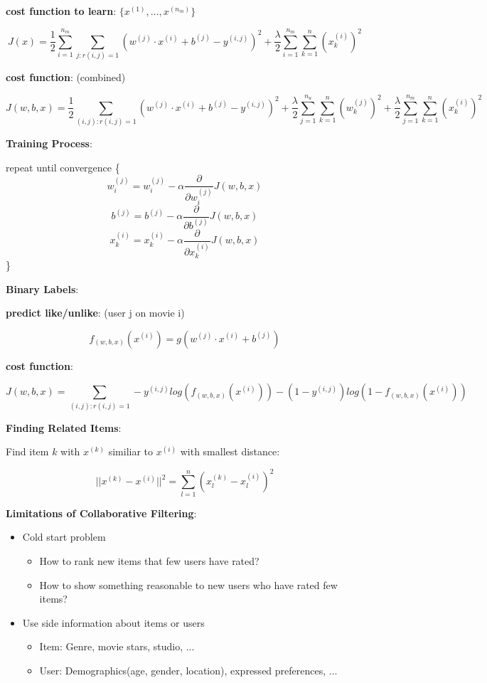 \documentclass{article}
\begin{document}
\noindent \textbf{cost function to learn}: \(\{x^{(1)}, \dots, x^{(n_m)}\}\)

\[J(x) = \frac{1}{2} \sum_{i = 1}^{n_m} \sum_{j:r(i, j)=1} (w^{(j)} \cdot x^{(i)} + b^{(j)} - y^{(i, j)})^2 + \frac{\lambda}{2} \sum_{i = 1}^{n_m} \sum_{k = 1}^{n} (x_{k}^{(i)})^2\]

\noindent \textbf{cost function}: (combined)

\[J(w, b, x) = \frac{1}{2} \sum_{(i, j):r(i, j)=1} (w^{(j)} \cdot x^{(i)} + b^{(j)} - y^{(i, j)})^2 + \frac{\lambda}{2} \sum_{j = 1}^{n_u} \sum_{k = 1}^{n} (w_{k}^{(j)})^2 + \frac{\lambda}{2} \sum_{j = 1}^{n_m} \sum_{k = 1}^{n} (x_{k}^{(i)})^2\]

\noindent \textbf{Training Process}:

\noindent repeat until convergence \{
\[w_{i}^{(j)} = w_{i}^{(j)} - \alpha \frac{\partial}{\partial w_{i}^{(j)}} J(w, b, x)\]
\[b^{(j)} = b^{(j)} - \alpha \frac{\partial}{\partial b^{(j)}} J(w, b, x)\]
\[x_{k}^{(i)} = x_{k}^{(i)} - \alpha \frac{\partial}{\partial x_{k}^{(i)}} J(w, b, x)\]
\noindent \}

\bigskip

\noindent \textbf{Binary Labels}:

\noindent \textbf{predict like/unlike}: (user j on movie i)

\[f_{(w, b, x)}(x^{(i)}) = g(w^{(j)} \cdot x^{(i)} + b^{(j)})\]

\noindent \textbf{cost function}:

\[J(w, b, x) = \sum_{(i, j):r(i, j)=1} -y^{(i, j)} log(f_{(w, b, x)}(x^{(i)})) - (1 - y^{(i, j)})log(1 - f_{(w, b, x)}(x^{(i)}))\]

\noindent \textbf{Finding Related Items}:

\noindent Find item \(k\) with \(x^{(k)}\) similiar to \(x^{(i)}\) with smallest distance:

\[\vert\vert x^{(k)} - x^{(i)} \vert\vert^2 = \sum_{l=1}^{n} (x_{l}^{(k)} - x_{l}^{(i)})^2\]

\noindent \textbf{Limitations of Collaborative Filtering}:

\begin{itemize}
    \item Cold start problem
    \begin{itemize}
        \item How to rank new items that few users have rated?
        \item How to show something reasonable to new users who have rated few items?
    \end{itemize}
    \item Use side information about items or users
    \begin{itemize}
        \item Item: Genre, movie stars, studio, ...
        \item User: Demographics(age, gender, location), expressed
preferences, ...
    \end{itemize}
\end{itemize}
\end{document}
